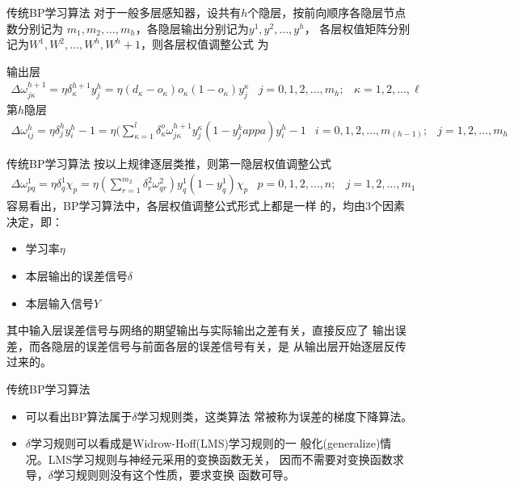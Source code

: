 \documentclass[xcolor=svgnames]{beamer}
\begin{document}
\begin{frame}{传统BP学习算法}
  对于一般多层感知器，设共有$h$个隐层，按前向顺序各隐层节点数分别记为%
  $m_1,m_2,\ldots,m_h$，各隐层输出分别记为$y^1,y^2,\ldots,y^h$，%
  各层权值矩阵分别记为$W^1,W^2,\ldots,W^h,W^h+1$，则各层权值调整公式%
  为

  输出层
  \begin{equation}
    \begin{array}{lll}
      \scriptstyle\Delta \omega_{j\kappa}^{h+1}=\eta \delta_{\kappa}^{h+1}y_j^h=\eta(d_\kappa-o_\kappa)o_\kappa(1-o_\kappa)y_j^\kappa & \scriptstyle j=0,1,2,\ldots,m_h; & \scriptstyle \kappa=1,2,\ldots,\ell
    \end{array}
  \end{equation}
  第$h$隐层
  \begin{equation}
    \begin{array}{lll}
      \scriptstyle\Delta \omega_{ij}^{h}=\eta \delta_j^hy_i^h-1=\eta(\sum _{\kappa=1}^l \delta_\kappa^o\omega_{j\kappa}^{h+1}y_j^\kappa(1-y_j^kappa)y_i^h-1 & \scriptstyle i=0,1,2,\ldots,m_(h-1); & \scriptstyle j=1,2,\ldots,m_h
    \end{array}
  \end{equation}
\end{frame}

\begin{frame}{传统BP学习算法}
  按以上规律逐层类推，则第一隐层权值调整公式
  \begin{equation}
    \begin{array}{lll}
      \scriptstyle \Delta \omega_{pq}^1=\eta \delta_q^1\chi_p=\eta(\sum_{r=1}^{m_{2}}\delta_r^2\omega_{qr}^2)y_q^1(1-y_q^1)\chi_p & \scriptstyle p=0,1,2,\ldots,n; & \scriptstyle j=1,2,\ldots,m_1
    \end{array}
  \end{equation}
  容易看出，BP学习算法中，\alert{各层权值调整公式形式上都是一样}%
  的，均由3个因素决定，即：
  \begin{itemize}
  \item 学习率$\eta$
  \item 本层输出的误差信号$\delta$
  \item 本层输入信号$Y$%
  \end{itemize}
  其中输入层误差信号与网络的期望输出与实际输出之差有关，直接反应了%
  输出误差，而各隐层的误差信号与前面各层的误差信号有关，是\alert{%
    从输出层开始逐层反传过来的}。
\end{frame}


\begin{frame}{传统BP学习算法}
  \begin{itemize}
  \item 可以看出BP算法\alert{属于$\delta$学习规则类}，这类算法%
    常被称为\alert{误差的梯度下降算法}。
  \item $\delta$学习规则可以看成是Widrow-Hoff(LMS)学习规则的一%
    般化(generalize)情况。LMS学习规则与神经元采用的变换函数无关，%
    因而不需要对变换函数求导，$\delta$学习规则则没有这个性质，要求变换%
    函数可导。
  \end{itemize}
\end{frame}
\end{document}
